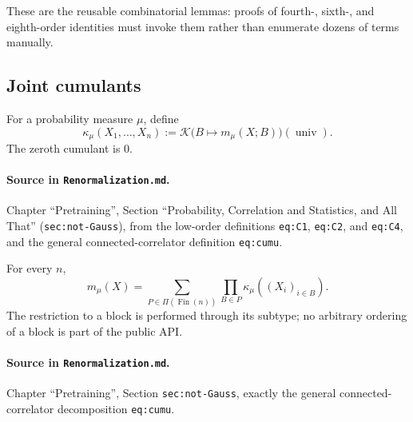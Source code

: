 These are the reusable combinatorial lemmas: proofs of fourth-, sixth-, and eighth-order identities
must invoke them rather than enumerate dozens of terms manually.

\subsection{Joint cumulants}

\begin{definition}
\label{def:renorm:jointCumulant}
For a probability measure $\mu$, define
\[
  \kappa_\mu(X_1,\ldots,X_n)
  :=\mathcal K\bigl(B\mapsto m_\mu(X;B)\bigr)(\operatorname{univ}).
\]
The zeroth cumulant is $0$.

\paragraph{Source in \texttt{Renormalization.md}.}
Chapter ``Pretraining'', Section ``Probability, Correlation and Statistics, and All That''
(\texttt{sec:not-Gauss}), from the low-order definitions \texttt{eq:C1}, \texttt{eq:C2}, and
\texttt{eq:C4}, and the general connected-correlator definition \texttt{eq:cumu}.
\end{definition}

\begin{theorem}
\label{thm:renorm:momentCumulant}
For every $n$,
\[
 m_\mu(X)=\sum_{P\in\Pi(\operatorname{Fin}(n))}
                 \prod_{B\in P}\kappa_\mu((X_i)_{i\in B}).
\]
The restriction to a block is performed through its subtype; no arbitrary ordering of a block is
part of the public API.

\paragraph{Source in \texttt{Renormalization.md}.}
Chapter ``Pretraining'', Section \texttt{sec:not-Gauss}, exactly the general connected-correlator
decomposition \texttt{eq:cumu}.
\end{theorem}

